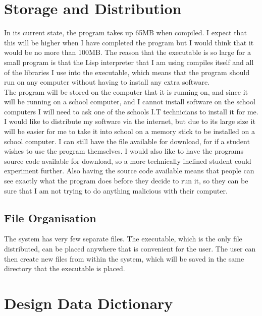 \section{Storage and Distribution}

In its current state, the program takes up 65MB when compiled. I expect that
this will be higher when I have completed the program but I would think that it
would be no more than 100MB\@. The reason that the executable is so large for a
small program is that the Lisp interpreter that I am using compiles itself and
all of the libraries I use into the executable, which means that the program
should run on any computer without having to install any extra software. \\

The program will be stored on the computer that it is running on, and since it
will be running on a school computer, and I cannot install software on the
school computers I will need to ask one of the schools I.T technicians to
install it for me. \\

I would like to distribute my software via the internet, but due to its large
size it will be easier for me to take it into school on a memory stick to be
installed on a school computer. I can still have the file available for
download, for if a student wishes to use the program themselves. I would also
like to have the programs source code available for download, so a more
technically inclined student could experiment further. Also having the source
code available means that people can see exactly what the program does before
they decide to run it, so they can be sure that I am not trying to do anything
malicious with their computer. \\

\subsection{File Organisation}

The system has very few separate files. The executable, which is the only file
distributed, can be placed anywhere that is convenient for the user. The user
can then create new files from within the system, which will be saved in the
same directory that the executable is placed. \\

\section{Design Data Dictionary}

